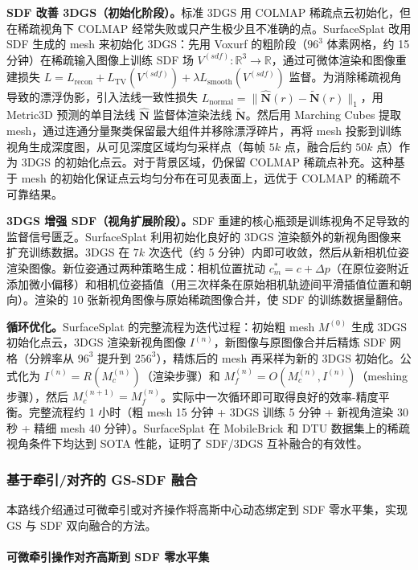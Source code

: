 \textbf{SDF 改善 3DGS（初始化阶段）。}标准 3DGS 用 COLMAP 稀疏点云初始化，但在稀疏视角下 COLMAP 经常失败或只产生极少且不准确的点。SurfaceSplat 改用 SDF 生成的 mesh 来初始化 3DGS：先用 Voxurf 的粗阶段（$96^3$ 体素网格，约 15 分钟）在稀疏输入图像上训练 SDF 场 $V^{(sdf)}: \mathbb{R}^3 \to \mathbb{R}$，通过可微体渲染和图像重建损失 $L = L_{\text{recon}} + L_{\text{TV}}(V^{(sdf)}) + \lambda L_{\text{smooth}}(V^{(sdf)})$ 监督。为消除稀疏视角导致的漂浮伪影，引入法线一致性损失 $L_{\text{normal}} = \|\hat{\mathbf{N}}(r) - \tilde{\mathbf{N}}(r)\|_1$，用 Metric3D 预测的单目法线 $\hat{\mathbf{N}}$ 监督体渲染法线 $\tilde{\mathbf{N}}$。然后用 Marching Cubes 提取 mesh，通过连通分量聚类保留最大组件并移除漂浮碎片，再将 mesh 投影到训练视角生成深度图，从可见深度区域均匀采样点（每帧 $5k$ 点，融合后约 $50k$ 点）作为 3DGS 的初始化点云。对于背景区域，仍保留 COLMAP 稀疏点补充。这种基于 mesh 的初始化保证点云均匀分布在可见表面上，远优于 COLMAP 的稀疏不可靠结果。

\textbf{3DGS 增强 SDF（视角扩展阶段）。}SDF 重建的核心瓶颈是训练视角不足导致的监督信号匮乏。SurfaceSplat 利用初始化良好的 3DGS 渲染额外的新视角图像来扩充训练数据。3DGS 在 $7k$ 次迭代（约 5 分钟）内即可收敛，然后从新相机位姿渲染图像。新位姿通过两种策略生成：相机位置扰动 $c_m^* = c + \Delta p$（在原位姿附近添加微小偏移）和相机位姿插值（用三次样条在原始相机轨迹间平滑插值位置和朝向）。渲染的 10 张新视角图像与原始稀疏图像合并，使 SDF 的训练数据量翻倍。

\textbf{循环优化。}SurfaceSplat 的完整流程为迭代过程：初始粗 mesh $M^{(0)}$ 生成 3DGS 初始化点云，3DGS 渲染新视角图像 $I^{(n)}$，新图像与原图像合并后精炼 SDF 网格（分辨率从 $96^3$ 提升到 $256^3$），精炼后的 mesh 再采样为新的 3DGS 初始化。公式化为 $I^{(n)} = R(M_c^{(n)})$（渲染步骤）和 $M_f^{(n)} = O(M_c^{(n)}, I^{(n)})$（meshing 步骤），然后 $M_c^{(n+1)} = M_f^{(n)}$。实际中一次循环即可取得良好的效率-精度平衡。完整流程约 1 小时（粗 mesh 15 分钟 + 3DGS 训练 5 分钟 + 新视角渲染 30 秒 + 精细 mesh 40 分钟）。SurfaceSplat 在 MobileBrick 和 DTU 数据集上的稀疏视角条件下均达到 SOTA 性能，证明了 SDF/3DGS 互补融合的有效性。

\subsubsection{基于牵引/对齐的 GS-SDF 融合}
\label{subsec:04_2_4}

本路线介绍通过可微牵引或对齐操作将高斯中心动态绑定到 SDF 零水平集，实现 GS 与 SDF 双向融合的方法。

\paragraph{可微牵引操作对齐高斯到 SDF 零水平集}


